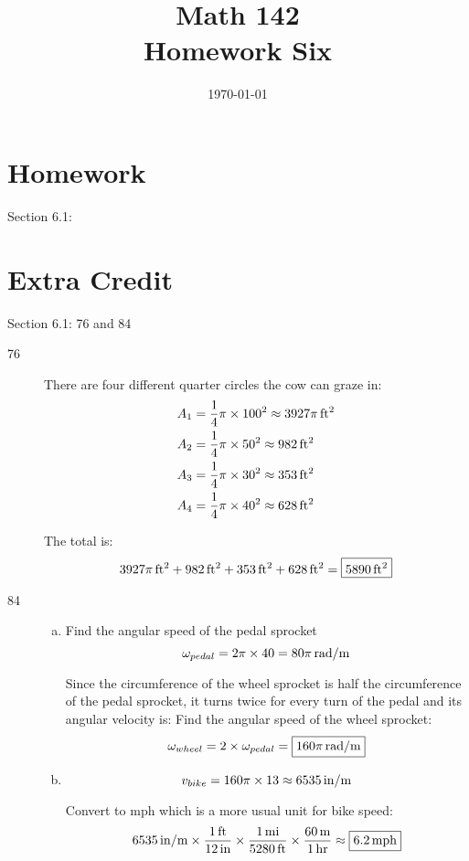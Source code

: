 \documentclass{exam}
\author{}
\date{\today}
\title{Math 142 \\ Homework Six}
\begin{document}
  \maketitle

  \section{Homework}
  Section 6.1: 

  \section{Extra Credit}
  Section 6.1: 76 and 84

  \ifprintanswers

    \begin{description}
      \item[76]
        There are four different quarter circles the cow can graze in:
        \begin{align*}
          A_1 &= \frac{1}{4} \pi \times 100^2 \approx \unit[3927 \pi]{ft^2} \\
          A_2 &= \frac{1}{4} \pi \times 50^2 \approx \unit[982]{ft^2} \\
          A_3 &= \frac{1}{4} \pi \times 30^2 \approx \unit[353]{ft^2} \\
          A_4 &= \frac{1}{4} \pi \times 40^2 \approx \unit[628]{ft^2} \\
        \end{align*}

        The total is:
        \[
          \unit[3927 \pi]{ft^2} + \unit[982]{ft^2} + \unit[353]{ft^2} + \unit[628]{ft^2} = \boxed{ \unit[5890]{ft^2} }
        \]
        
      \item[84]
        \begin{enumerate}[(a)]

          \item 
            Find the angular speed of the pedal sprocket
            \[
              \omega_{pedal} = 2 \pi \times 40 = \unit[80 \pi]{rad/m}
            \]

            Since the circumference of the wheel sprocket is half the circumference of the pedal sprocket, it turns
            twice for every turn of the pedal and its angular velocity is:
            Find the angular speed of the wheel sprocket:
            \[
              \omega_{wheel} = 2 \times \omega_{pedal} = \boxed{ \unit[160 \pi]{rad/m} } 
            \]

          \item 
            \[
              v_{bike} = 160 \pi \times 13 \approx \unit[ 6535 ]{in/m}
            \]

            Convert to mph which is a more usual unit for bike speed:
            \[
              \unit[ 6535 ]{in/m} \times \frac{\unit[1]{ft}}{\unit[12]{in}} \times \frac{\unit[1]{mi}}{\unit[5280]{ft}}
              \times \frac{\unit[60]{m}}{\unit[1]{hr}} \approx \boxed{ \unit[6.2]{mph} }
            \]


        \end{enumerate}
    \end{description}
\end{document}
